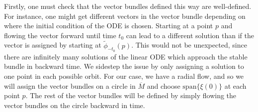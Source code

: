 Firstly, one must check that the vector bundles defined this way are well-defined. For instance, one might get different vectors in the vector bundle depending on where the initial condition of the ODE is chosen. Starting at a point \(p\) and flowing the vector forward until time \(t_0\) can lead to a different solution than if the vector is assigned by starting at \(\tilde\phi_{-t_0}(p)\). This would not be unexpected, since there are infinitely many solutions of the linear ODE which approach the stable bundle in backward time. We sidestep the issue by only assigning a solution to one point in each possible orbit. For our case, we have a radial flow, and so we will assign the vector bundles on a circle in \(\overline M\) and choose \(\mathrm{span}\{\xi(0)\}\) at each point \(p\). The rest of the vector bundles will be defined by simply flowing the vector bundles on the circle backward in time. 

